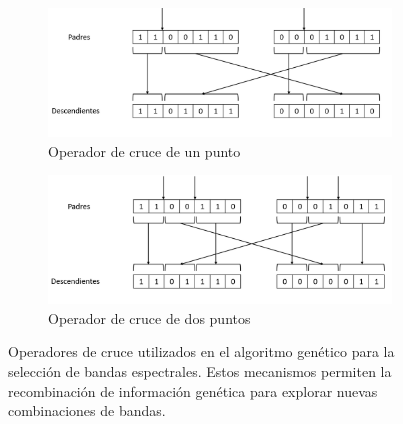 \begin{figure}[!ht]
\centering
\begin{subfigure}[b]{0.45\textwidth}
    \includegraphics[width=\textwidth]{images/cruce1punto.png}
    \caption{Operador de cruce de un punto}
    \label{fig:cruce_un_punto}
\end{subfigure}
\hfill
\begin{subfigure}[b]{0.45\textwidth}
    \includegraphics[width=\textwidth]{images/cruce2puntos.png}
    \caption{Operador de cruce de dos puntos}
    \label{fig:cruce_dos_puntos}
\end{subfigure}
\caption{Operadores de cruce utilizados en el algoritmo genético para la selección de bandas espectrales. Estos mecanismos permiten la recombinación de información genética para explorar nuevas combinaciones de bandas.}
\label{fig:operadores_cruce}
\end{figure}

